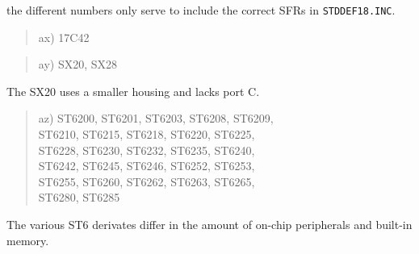 \documentclass[12pt,twoside]{report}
\newcommand{\tty}[1]{{\tt #1}}
\begin{document}
the different numbers only serve to include the correct SFRs in
\tty{STDDEF18.INC}.
\begin{quote}
ax) 17C42
\end{quote}
\begin{quote}
ay) SX20, SX28
\end{quote}
The SX20 uses a smaller housing and lacks port C.
\begin{quote}
az) ST6200, ST6201, ST6203, ST6208, ST6209,\\
    ST6210, ST6215, ST6218, ST6220, ST6225,\\
    ST6228, ST6230, ST6232, ST6235, ST6240,\\
    ST6242, ST6245, ST6246, ST6252, ST6253,\\
    ST6255, ST6260, ST6262, ST6263, ST6265,\\
    ST6280, ST6285
\end{quote}
The various ST6 derivates differ in the amount of
on-chip peripherals and built-in memory.
\end{document}
